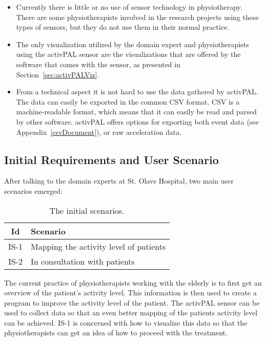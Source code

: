 \begin{itemize}
\item Currently there is little or no use of sensor technology in physiotherapy. There are some physiotherapists involved in the research projects using these types of sensors, but they do not use them in their normal practice. 

\item The only visualization utilized by the domain expert and physiotherapists using the activPAL sensor are the visualizations that are offered by the software that comes with the sensor, as presented in Section~\ref{sec:activPALViz}.

\item From a technical aspect it is not hard to use the data gathered by activPAL. The data can easily be exported in the common CSV format. CSV is a machine-readable format, which means that it can easily be read and parsed by other software. activPAL offers options for exporting both event data (see Appendix~\ref{csvDocument}), or raw acceleration data.

\end{itemize}

\subsection{Initial Requirements and User Scenario}
After talking to the domain experts at St. Olavs Hospital, two main user scenarios emerged:

\begin{table}[!h]
  \centering
  \begin{tabular}{|c|l|}
    \hline
    \textbf{Id} & \textbf{Scenario} \\ \hline
    IS-1 & Mapping the activity level of patients \\ \hline
    IS-2 & In consultation with patients \\ \hline
  \end{tabular}
  \caption[Initial scenarios]{The initial scenarios.}
\end{table}

The current practice of physiotherapists working with the elderly is to first get an overview of the patient's activity level. This information is then used to create a program to improve the activity level of the patient. The activPAL sensor can be used to collect data so that an even better mapping of the patients activity level can be achieved. IS-1 is concerned with how to visualize this data so that the physiotherapists can get an idea of how to proceed with the treatment.

